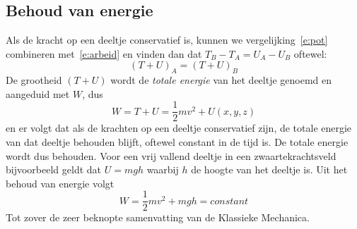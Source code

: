 \subsection{Behoud van energie}
Als de kracht op een deeltje conservatief is, kunnen we vergelijking~\ref{e:pot}
combineren met~\ref{e:arbeid} en vinden dan dat $T_B-T_A = U_A-U_B$ oftewel:
\begin{equation}
(T+U)_A = (T+U)_B
\end{equation}
De grootheid $(T+U)$ wordt de {\it totale energie} van het deeltje genoemd en aangeduid met $W$, dus
\begin{equation}
W = T+U = \frac{1}{2} m v^2 + U(x,y,z)
\end{equation}
en er volgt dat als de krachten op een deeltje conservatief zijn, de
totale energie van dat deeltje behouden blijft, oftewel constant in de tijd is. De
totale energie wordt dus behouden. Voor een vrij vallend deeltje in een zwaartekrachtsveld bijvoorbeeld
geldt dat $U=mgh$ waarbij $h$ de hoogte van het deeltje is. Uit het
behoud van energie volgt
\begin{equation}
W = \frac{1}{2}m v^2 + mgh = constant
\end{equation}
Tot zover de zeer beknopte samenvatting van de Klassieke Mechanica.  

